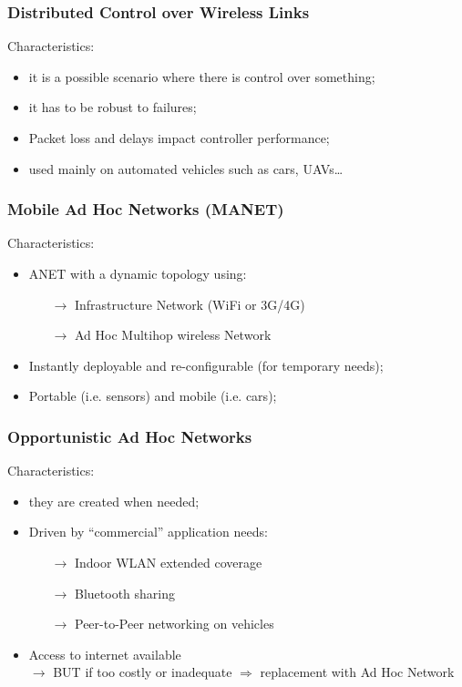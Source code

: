 \subsubsection{Distributed Control over Wireless Links}

Characteristics:
\begin{itemize}
    \item it is a possible scenario where there is control over something;
    \item it has to be robust to failures;
    \item Packet loss and delays impact controller performance;
    \item used mainly on automated vehicles such as cars, UAVs\dots
\end{itemize}
\newpage
\subsubsection{Mobile Ad Hoc Networks (MANET)}

Characteristics:
\begin{itemize}
    \item ANET with a dynamic topology using:
    \begin{itemize}
        \item[$\rightarrow$] Infrastructure Network (WiFi or 3G/4G)
        \item[$\rightarrow$] Ad Hoc Multihop wireless Network
    \end{itemize}
    \item Instantly deployable and re-configurable (for temporary needs);
    \item Portable (i.e. sensors) and mobile (i.e. cars);
\end{itemize}

\subsubsection{Opportunistic Ad Hoc Networks}

Characteristics:
\begin{itemize}
    \item they are created when needed;
    \item Driven by “commercial” application needs:
    \begin{itemize}
        \item[$\rightarrow$] Indoor WLAN extended coverage
        \item[$\rightarrow$] Bluetooth sharing
        \item[$\rightarrow$] Peer-to-Peer networking on vehicles
    \end{itemize}
    \item Access to internet available\\ $\rightarrow$ BUT if too costly or inadequate
    $\Rightarrow$ replacement with Ad Hoc Network
\end{itemize}

